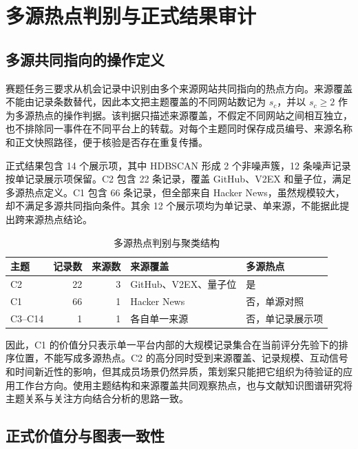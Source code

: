\section{多源热点判别与正式结果审计}

\subsection{多源共同指向的操作定义}

赛题任务三要求从机会记录中识别由多个来源网站共同指向的热点方向。来源覆盖不能由记录条数替代，因此本文把主题覆盖的不同网站数记为 $s_c$，并以 $s_c\geq2$ 作为多源热点的操作判据。该判据只描述来源覆盖，不假定不同网站之间相互独立，也不排除同一事件在不同平台上的转载。对每个主题同时保存成员编号、来源名称和正文快照路径，便于核验是否存在重复传播。

正式结果包含 14 个展示项，其中 HDBSCAN 形成 2 个非噪声簇，12 条噪声记录按单记录展示项保留。C2 包含 22 条记录，覆盖 GitHub、V2EX 和量子位，满足多源热点定义。C1 包含 66 条记录，但全部来自 Hacker News，虽然规模较大，却不满足多源共同指向条件。其余 12 个展示项均为单记录、单来源，不能据此提出跨来源热点结论。

\begin{table}[H]
  \centering
  \small
  \caption[多源热点判别与聚类结构]{多源热点判别与聚类结构}
  \label{tab:multisource-audit}
  \begin{tabular}{lrrp{}l}
    \toprule
    主题 & 记录数 & 来源数 & 来源覆盖 & 多源热点 \ \\
    \midrule
    C2 & 22 & 3 & GitHub、V2EX、量子位 & 是 \\
    C1 & 66 & 1 & Hacker News & 否，单源对照 \\
    C3--C14 & 1 & 1 & 各自单一来源 & 否，单记录展示项 \\
    \bottomrule
  \end{tabular}
\end{table}

因此，C1 的价值分只表示单一平台内部的大规模记录集合在当前评分先验下的排序位置，不能写成多源热点。C2 的高分同时受到来源覆盖、记录规模、互动信号和时间新近性的影响，但其成员场景仍然异质，策划案只能把它组织为待验证的应用工作台方向。使用主题结构和来源覆盖共同观察热点，也与文献知识图谱研究将主题关系与关注方向结合分析的思路一致\cite{wang2023soilmining}。

\subsection{正式价值分与图表一致性}

